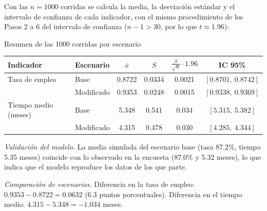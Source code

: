 Con las $n = 1000$ corridas se calcula la media, la desviación estándar y el intervalo de confianza de cada indicador, con el mismo procedimiento de los Pasos 2 a 6 del intervalo de confianza ($n - 1 > 30$, por lo que $t \approx 1.96$):

\begin{mitabla}{Resumen de las 1000 corridas por escenario \datosprueba}
\begin{tabular}{llcccc}
\toprule
Indicador & Escenario & $\bar{x}$ & $S$ & $\frac{S}{\sqrt{n}} \cdot 1.96$ & IC 95\% \\
\midrule
Tasa de empleo & Base & 0.8722 & 0.0334 & 0.0021 & $[0.8701,\ 0.8742]$ \\
 & Modificado & 0.9353 & 0.0248 & 0.0015 & $[0.9338,\ 0.9369]$ \\
Tiempo medio (meses) & Base & 5.348 & 0.541 & 0.034 & $[5.315,\ 5.382]$ \\
 & Modificado & 4.315 & 0.478 & 0.030 & $[4.285,\ 4.344]$ \\
\bottomrule
\end{tabular}
\end{mitabla}

\textit{Validación del modelo.} La media simulada del escenario base (tasa 87.2\%, tiempo 5.35 meses) coincide con lo observado en la encuesta (87.0\% y 5.32 meses), lo que indica que el modelo reproduce los datos de los que parte.

\textit{Comparación de escenarios.} Diferencia en la tasa de empleo: $0.9353 - 0.8722 = 0.0632$ (6.3 puntos porcentuales). Diferencia en el tiempo medio: $4.315 - 5.348 = -1.034$ meses. \datosprueba

